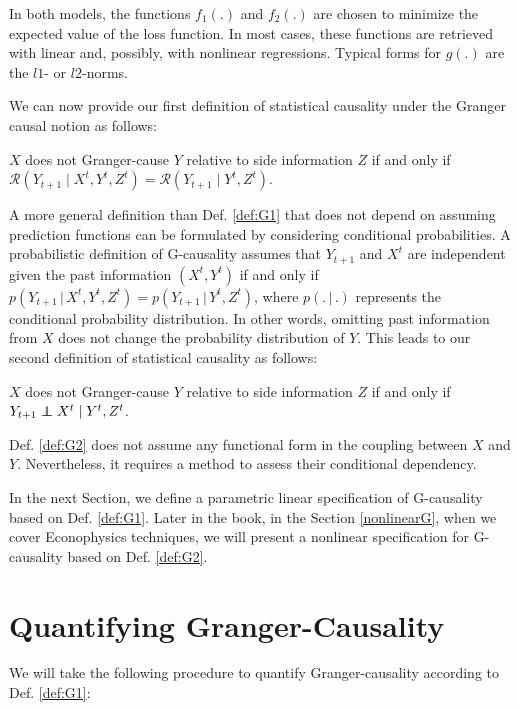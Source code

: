 \documentclass[]{book}
\theoremstyle{definition}
\theoremstyle{definition}
\theoremstyle{definition}
\theoremstyle{remark}
\let\BeginKnitrBlock\begin \let\EndKnitrBlock\end
\begin{document}
In both models, the functions \(f_1(.)\) and \(f_2(.)\) are chosen to
minimize the expected value of the loss function. In most cases, these
functions are retrieved with linear and, possibly, with nonlinear
regressions. Typical forms for \(g(.)\) are the \(l1\)- or \(l2\)-norms.

We can now provide our first definition of statistical causality under
the Granger causal notion as follows:

\BeginKnitrBlock{definition}
\protect\hypertarget{def:G1}{}{\label{def:G1} }\(X\) does not Granger-cause
\(Y\) relative to side information \(Z\) if and only if
\(\mathcal{R}(Y_{t+1} \; | \; X^t, Y^t, Z^t) = \mathcal{R}(Y_{t+1} \; | \; Y^t, Z^t)\).
\EndKnitrBlock{definition}

A more general definition than Def. \ref{def:G1} that does not depend on
assuming prediction functions can be formulated by considering
conditional probabilities. A probabilistic definition of G-causality
assumes that \(Y_{t+1}\) and \(X^{t}\) are independent given the past
information \((X^{t}, Y^{t})\) if and only if
\(p(Y_{t+1} \, | \, X^{t}, Y^{t}, Z^{t}) = p(Y_{t+1} \, | \, Y^{t}, Z^{t})\),
where \(p(. \, | \, .)\) represents the conditional probability
distribution. In other words, omitting past information from \(X\) does
not change the probability distribution of \(Y\). This leads to our
second definition of statistical causality as follows:

\BeginKnitrBlock{definition}
\protect\hypertarget{def:G2}{}{\label{def:G2} }\(X\) does not Granger-cause
\(Y\) relative to side information \(Z\) if and only if
\(Y_{t+1} \perp\!\!\!\!\perp X^{t} \; | \; Y^{t}, Z^{t}\).
\EndKnitrBlock{definition}

Def. \ref{def:G2} does not assume any functional form in the coupling
between \(X\) and \(Y\). Nevertheless, it requires a method to assess
their conditional dependency.

In the next Section, we define a parametric linear specification of
G-causality based on Def. \ref{def:G1}. Later in the book, in the
Section \ref{nonlinearG}, when we cover Econophysics techniques, we will
present a nonlinear specification for G-causality based on Def.
\ref{def:G2}.

\section{Quantifying Granger-Causality}\label{LinearG}

We will take the following procedure to quantify Granger-causality
according to Def. \ref{def:G1}:
\end{document}

